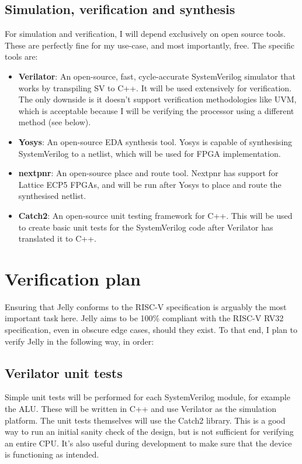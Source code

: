 \documentclass{article}
\begin{document}
\subsection{Simulation, verification and synthesis}
For simulation and verification, I will depend exclusively on open source tools. These are perfectly fine for
my use-case, and most importantly, free. The specific tools are:
\begin{itemize}
	\item \textbf{Verilator}: An open-source, fast, cycle-accurate SystemVerilog simulator that works by 
		transpiling SV to C++. It will be used extensively for verification. The only downside is it 
		doesn't support verification methodologies like UVM, which is acceptable because I will be 
		verifying the processor using a different method (see below).
	\item \textbf{Yosys}: An open-source EDA synthesis tool. Yosys is capable of synthesising SystemVerilog 
		to a netlist, which will be used for FPGA implementation.
	\item \textbf{nextpnr}: An open-source place and route tool. Nextpnr has support for Lattice ECP5 
		FPGAs, and will be run after Yosys to place and route the synthesised netlist.
	\item \textbf{Catch2}: An open-source unit testing framework for C++. This will be used to create 
		basic unit tests for the SystemVerilog code after Verilator has translated it to C++.
\end{itemize}

\section{Verification plan}
Ensuring that Jelly conforms to the RISC-V specification is arguably the most important task here. Jelly aims
to be 100\% compliant with the RISC-V RV32 specification, even in obscure edge cases, should they exist.
To that end, I plan to verify Jelly in the following way, in order:

\subsection{Verilator unit tests}
Simple unit tests will be performed for each SystemVerilog module, for example the ALU. These will be written
in C++ and use Verilator as the simulation platform. The unit tests themselves will use the Catch2 library.
This is a good way to run an initial sanity check of the design, but is not sufficient for verifying an
entire CPU. It's also useful during development to make sure that the device is functioning as intended.
\end{document}
